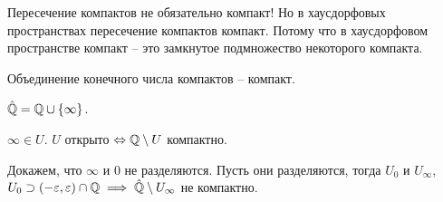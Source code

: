 \documentclass[main]{subfiles}
\begin{document}
\begin{remark}
    Пересечение компактов не обязательно компакт!
    Но в хаусдорфовых пространствах пересечение компактов компакт.
    Потому что в хаусдорфовом пространстве компакт -- это замкнутое подмножество некоторого компакта.
\end{remark}
\begin{remark}
    Объединение конечного числа компактов -- компакт.
\end{remark}

\begin{example}
    $\hat{\mathbb{Q}} = \mathbb{Q} \cup \{\infty\}$.

    $\infty \in U$. $U$ открыто $\Leftrightarrow \mathbb{Q} \setminus U$ компактно.

    Докажем, что $\infty$ и $0$ не разделяются.
    Пусть они разделяются, тогда
    $U_0$ и  $U_\infty$, $U_0 \supset (-\varepsilon, \varepsilon) \cap \mathbb{Q} \implies \hat{\mathbb{Q}} \setminus U_\infty$ не компактно.
\end{example}
\end{document}
